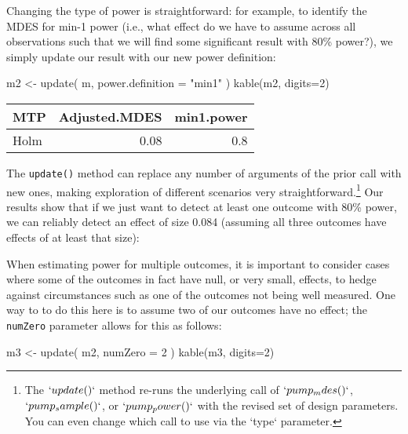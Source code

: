 \documentclass[
]{article}
\newenvironment{Shaded}{\begin{snugshade}}{\end{snugshade}}
\newcommand{\AttributeTok}[1]{\textcolor[rgb]{0.77,0.63,0.00}{#1}}
\newcommand{\DecValTok}[1]{\textcolor[rgb]{0.00,0.00,0.81}{#1}}
\newcommand{\FunctionTok}[1]{\textcolor[rgb]{0.00,0.00,0.00}{#1}}
\newcommand{\NormalTok}[1]{#1}
\newcommand{\OtherTok}[1]{\textcolor[rgb]{0.56,0.35,0.01}{#1}}
\newcommand{\StringTok}[1]{\textcolor[rgb]{0.31,0.60,0.02}{#1}}
\begin{document}
Changing the type of power is straightforward: for example, to identify
the MDES for min-1 power (i.e., what effect do we have to assume across
all observations such that we will find some significant result with
80\% power?), we simply update our result with our new power definition:

\begin{Shaded}
\begin{Highlighting}[]
\NormalTok{m2 }\OtherTok{\textless{}{-}} \FunctionTok{update}\NormalTok{( m, }\AttributeTok{power.definition =} \StringTok{"min1"}\NormalTok{ )}
\FunctionTok{kable}\NormalTok{(m2, }\AttributeTok{digits=}\DecValTok{2}\NormalTok{)}
\end{Highlighting}
\end{Shaded}

\begin{tabular}{l|r|r}
\hline
MTP & Adjusted.MDES & min1.power\\
\hline
Holm & 0.08 & 0.8\\
\hline
\end{tabular}

The \texttt{update()} method can replace any number of arguments of the
prior call with new ones, making exploration of different scenarios very
straightforward.\footnote{The $`update()`$ method re-runs the underlying call of $`pump_mdes()`$, $`pump_sample()`$, or $`pump_power()`$ with the revised set of design parameters. You can even change which call to use via the `type` parameter.}
Our results show that if we just want to detect at least one outcome
with 80\% power, we can reliably detect an effect of size 0.084
(assuming all three outcomes have effects of at least that size):

When estimating power for multiple outcomes, it is important to consider
cases where some of the outcomes in fact have null, or very small,
effects, to hedge against circumstances such as one of the outcomes not
being well measured. One way to to do this here is to assume two of our
outcomes have no effect; the \texttt{numZero} parameter allows for this
as follows:

\begin{Shaded}
\begin{Highlighting}[]
\NormalTok{m3 }\OtherTok{\textless{}{-}} \FunctionTok{update}\NormalTok{( m2, }\AttributeTok{numZero =} \DecValTok{2}\NormalTok{ )}
\FunctionTok{kable}\NormalTok{(m3, }\AttributeTok{digits=}\DecValTok{2}\NormalTok{)}
\end{Highlighting}
\end{Shaded}
\end{document}
